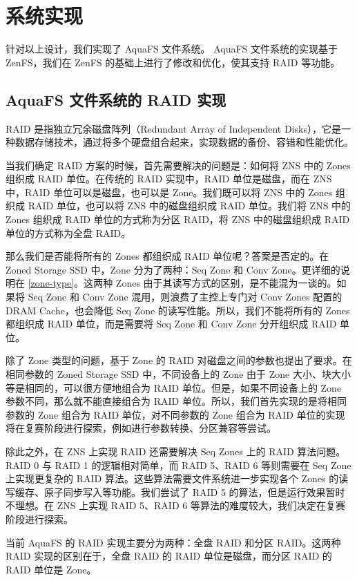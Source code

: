 \section{系统实现}

针对以上设计，我们实现了 AquaFS 文件系统。
AquaFS 文件系统的实现基于 ZenFS，我们在 ZenFS 的基础上进行了修改和优化，使其支持 RAID 等功能。

\subsection{AquaFS 文件系统的 RAID 实现}

RAID 是指独立冗余磁盘阵列（Redundant Array of Independent Disks），它是一种数据存储技术，通过将多个硬盘组合起来，实现数据的备份、容错和性能优化。

当我们确定 RAID 方案的时候，首先需要解决的问题是：如何将 ZNS 中的 Zones 组织成 RAID 单位。在传统的 RAID 实现中，RAID 单位是磁盘，而在 ZNS 中，RAID 单位可以是磁盘，也可以是 Zone。我们既可以将 ZNS 中的 Zones 组织成 RAID 单位，也可以将 ZNS 中的磁盘组织成 RAID 单位。我们将 ZNS 中的 Zones 组织成 RAID 单位的方式称为分区 RAID，将 ZNS 中的磁盘组织成 RAID 单位的方式称为全盘 RAID。

那么我们是否能将所有的 Zones 都组织成 RAID 单位呢？答案是否定的。在 Zoned Storage SSD 中，Zone 分为了两种：Seq Zone 和 Conv Zone。更详细的说明在 \ref{zone-type}。这两种 Zones 由于其读写方式的区别，是不能混为一谈的。如果将 Seq Zone 和 Conv Zone 混用，则浪费了主控上专门对 Conv Zones 配置的 DRAM Cache，也会降低 Seq Zone 的读写性能。所以，我们不能将所有的 Zones 都组织成 RAID 单位，而是需要将 Seq Zone 和 Conv Zone 分开组织成 RAID 单位。

除了 Zone 类型的问题，基于 Zone 的 RAID 对磁盘之间的参数也提出了要求。在相同参数的 Zoned Storage SSD 中，不同设备上的 Zone 由于 Zone 大小、块大小等是相同的，可以很方便地组合为 RAID 单位。但是，如果不同设备上的 Zone 参数不同，那么就不能直接组合为 RAID 单位。所以，我们首先实现的是将相同参数的 Zone 组合为 RAID 单位，对不同参数的 Zone 组合为 RAID 单位的实现将在复赛阶段进行探索，例如进行参数转换、分区兼容等尝试。

除此之外，在 ZNS 上实现 RAID 还需要解决 Seq Zones 上的 RAID 算法问题。RAID 0 与 RAID 1 的逻辑相对简单，而 RAID 5、RAID 6 等则需要在 Seq Zone 上实现更复杂的 RAID 算法。这些算法需要文件系统进一步实现各个 Zones 的读写缓存、原子同步写入等功能。我们尝试了 RAID 5 的算法，但是运行效果暂时不理想。在 ZNS 上实现 RAID 5、RAID 6 等算法的难度较大，我们决定在复赛阶段进行探索。

当前 AquaFS 的 RAID 实现主要分为两种：全盘 RAID 和分区 RAID。这两种 RAID 实现的区别在于，全盘 RAID 的 RAID 单位是磁盘，而分区 RAID 的 RAID 单位是 Zone。

